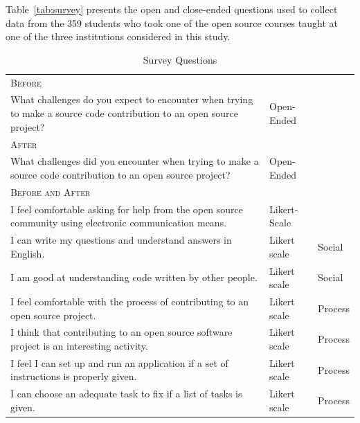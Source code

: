 \documentclass[sigconf]{acmart}
\begin{document}
\begin{sloppy}
Table~\ref{tab:survey} presents the open and close-ended questions used to collect data from the 359 students who took one of the open source courses taught at one of the three institutions considered in this study.

\begin{table}[]
\centering
\caption{Survey Questions}
\vspace{-3mm}
\footnotesize
\begin{tabular}{p{13.6cm}ll}
\toprule
\textsc{Before}&                                                                                                    \\
What challenges do you expect to encounter when trying to make a source code contribution to an open source project?&Open-Ended \\
\midrule
\textsc{After}&                                                                                                                          \\
What challenges did you encounter when trying to make a source code contribution to an open source project?&Open-Ended          \\
\midrule
\textsc{Before and After}&                                                                                                               \\
I feel comfortable asking for help from the open source community using electronic communication means.&Likert-Scale        \\
I can write my questions and understand answers in English.&Likert scale & Social                                                    \\
I am good at understanding code written by other people.&Likert scale  & Social                                                      \\
I feel comfortable with the process of contributing to an open source project.& Likert scale  & Process                                \\
I think that contributing to an open source software project is an interesting activity.&Likert scale    & Process                     \\

I feel I can set up and run an application if a set of instructions is properly given.& Likert scale   & Process                       \\
I can choose an adequate task to fix if a list of tasks is given.& Likert scale    & Process                                           \\


\end{tabular}
\end{table}
\end{sloppy}
\end{document}
